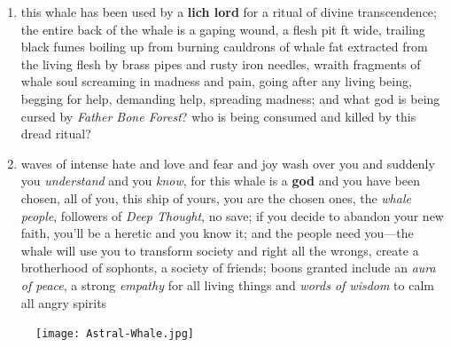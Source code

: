 \documentclass[11pt]{bxart}
\begin{document}
\begin{enumerate}
\item this whale has been used by a \textbf{lich lord} for a ritual of
  divine transcendence; the entire back of the whale is a gaping
  wound, a flesh pit \unit[500]{ft} wide, trailing black fumes boiling up from
  burning cauldrons of whale fat extracted from the living flesh by
  brass pipes and rusty iron needles, wraith fragments of whale soul
  screaming in madness and pain, going after any living being, begging
  for help, demanding help, spreading madness; and what god is being
  cursed by \textit{Father Bone Forest}? who is being consumed and
  killed by this dread ritual?

\item waves of intense hate and love and fear and joy wash over you
  and suddenly you \textit{understand} and you \textit{know}, for this
  whale is a \textbf{god} and you have been chosen, all of you, this
  ship of yours, you are the chosen ones, the \textit{whale people},
  followers of \textit{Deep Thought}, no save; if you decide to
  abandon your new faith, you'll be a heretic and you know it; and the
  people need you—the whale will use you to transform society and
  right all the wrongs, create a brotherhood of sophonts, a society of
  friends; boons granted include an \textit{aura of peace}, a strong
  \textit{empathy} for all living things and \textit{words of wisdom}
  to calm all angry spirits
\end{enumerate}

\begin{figure}[h]
  \centering
  \texttt{[image: Astral-Whale.jpg]}
\end{figure}
\end{document}
